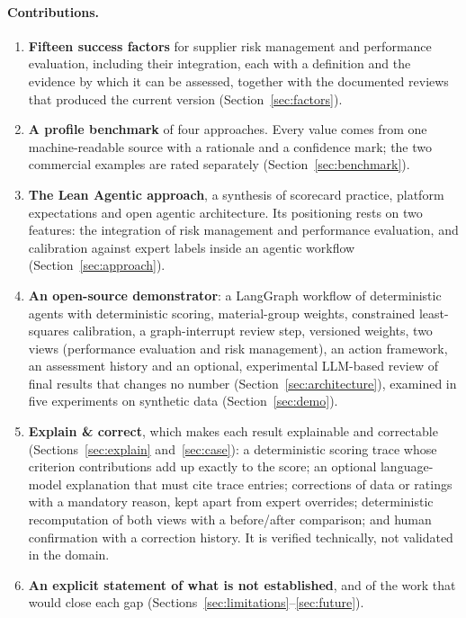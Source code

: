 \documentclass[10pt,twocolumn,a4paper]{article}
\begin{document}
\paragraph{Contributions.}
\begin{enumerate}
  \item \textbf{Fifteen success factors} for supplier risk management and performance
  evaluation, including their integration, each with a definition and the evidence by
  which it can be assessed, together with the documented reviews that produced the
  current version (Section~\ref{sec:factors}).
  \item \textbf{A profile benchmark} of four approaches. Every value comes from one
  machine-readable source with a rationale and a confidence mark; the two commercial
  examples are rated separately (Section~\ref{sec:benchmark}).
  \item \textbf{The Lean Agentic approach}, a synthesis of scorecard practice, platform
  expectations and open agentic architecture. Its positioning rests on two features: the
  integration of risk management and performance evaluation, and calibration against
  expert labels inside an agentic workflow (Section~\ref{sec:approach}).
  \item \textbf{An open-source demonstrator}: a LangGraph workflow of deterministic
  agents with deterministic scoring, material-group weights, constrained least-squares calibration, a
  graph-interrupt review step, versioned weights, two views (performance evaluation and
  risk management), an action framework, an assessment history and an optional,
  experimental LLM-based review of final results that changes no number
  (Section~\ref{sec:architecture}), examined in five experiments on synthetic data
  (Section~\ref{sec:demo}).
  \item \textbf{Explain \& correct}, which makes each result explainable and correctable
  (Sections~\ref{sec:explain} and~\ref{sec:case}): a deterministic scoring trace whose
  criterion contributions add up exactly to the score; an optional language-model explanation
  that must cite trace entries; corrections of data or ratings with a mandatory reason, kept apart
  from expert overrides; deterministic recomputation of both views with a before/after
  comparison; and human confirmation with a correction history. It is verified technically, not
  validated in the domain.
  \item \textbf{An explicit statement of what is not established}, and of the work that
  would close each gap (Sections~\ref{sec:limitations}--\ref{sec:future}).
\end{enumerate}
\end{document}
